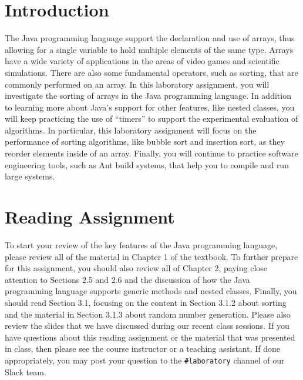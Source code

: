 

\usepackage[compact]{titlesec}



\section*{Introduction}

The Java programming language support the declaration and use of arrays, thus allowing for a single variable to hold
multiple elements of the same type. Arrays have a wide variety of applications in the areas of video games and
scientific simulations. There are also some fundamental operators, such as sorting, that are commonly performed on an
array. In this laboratory assignment, you will investigate the sorting of arrays in the Java programming language.  In
addition to learning more about Java's support for other features, like nested classes, you will keep practicing the use
of ``timers'' to support the experimental evaluation of algorithms. In particular, this laboratory assignment will focus
on the performance of sorting algorithms, like bubble sort and insertion sort, as they reorder elements inside of an
array. Finally, you will continue to practice software engineering tools, such as Ant build systems, that help you to
compile and run large systems.

\section*{Reading Assignment}

To start your review of the key features of the Java programming language, please review all of the material in Chapter
1 of the textbook. To further prepare for this assignment, you should also review all of Chapter 2, paying close
attention to Sections 2.5 and 2.6 and the discussion of how the Java programming language supports generic methods and
nested classes. Finally, you should read Section 3.1, focusing on the content in Section 3.1.2 about sorting and the
material in Section 3.1.3 about random number generation. Please also review the slides that we have discussed during
our recent class sessions. If you have questions about this reading assignment or the material that was presented in
class, then please see the course instructor or a teaching assistant. If done appropriately, you may post your question
to the {\tt \#laboratory} channel of our Slack team.

